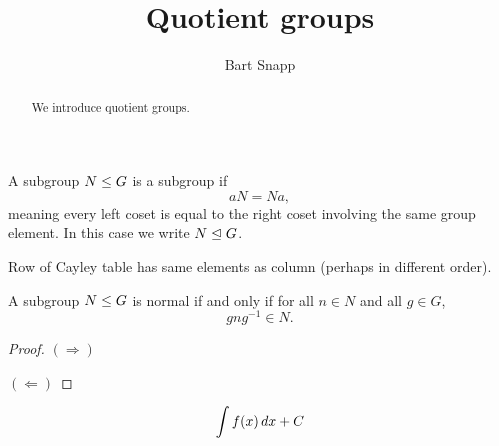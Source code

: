 \documentclass{ximera}
\author{Bart Snapp}
\title{Quotient groups}
\begin{document}
\begin{abstract}
  We introduce quotient groups.
\end{abstract}
\maketitle

\begin{definition}
  A subgroup $N\leq G$ is a  subgroup if
  \[
  aN = Na,
  \]
  meaning every left coset is equal to the right coset involving the
  same group element. In this case we write $N\trianglelefteq G$. 
\end{definition}

Row of Cayley table has same elements as column (perhaps in different order).



\begin{lemma}
  A subgroup $N\leq G$ is normal if and only if for all $n\in N$ and
  all $g\in G$,
  \[
  gng^{-1}\in N.
  \]
  \begin{proof}
    $(\Rightarrow)$

    $(\Leftarrow)$
  \end{proof}
\end{lemma}



\[
\int f(x) \, d x + C
\]


\begin{theorem}
\end{theorem}
\end{document}
